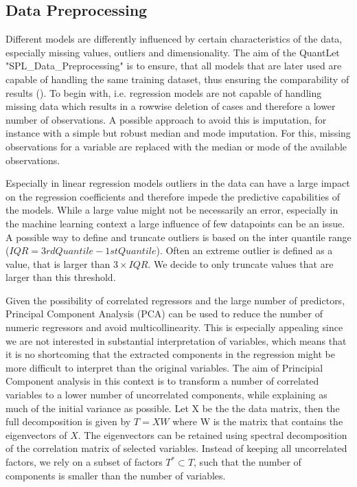 \subsection{Data Preprocessing}\label{sec:data_theory}

Different models are differently influenced by certain characteristics of the data, especially missing values, outliers and dimensionality.  The aim of the QuantLet "SPL\_Data\_Preprocessing" is to ensure, that all models that are later used are capable of handling the same training dataset, thus ensuring the comparability of results (\cite{friedman_elements_2001}). 
To begin with, i.e. regression models are not capable of handling missing data which results in a rowwise deletion of cases and therefore a lower number of observations. A possible approach to avoid this is  imputation, for instance with a simple but robust median and mode imputation. For this, missing observations for a variable are replaced with the median or mode of the available observations.

Especially in linear regression models outliers in the data can have a large impact on the regression coefficients and therefore impede the predictive  capabilities of the  models. While a large value might not be necessarily an error, especially in the machine learning context a large influence of few datapoints can be an issue. A possible way to define and truncate outliers is based on the inter quantile range ($IQR = 3rd Quantile -1st Quantile$).
Often an extreme outlier is defined as a value, that is larger than $3 \times IQR$. We decide to only truncate values that are larger than this threshold. 

Given the possibility of correlated regressors and the large number of predictors, Principal Component Analysis (PCA) can be used to reduce the number of numeric regressors and avoid multicollinearity. This is especially appealing since we are not interested in substantial interpretation of variables, which means that it is no shortcoming that the extracted components in the regression might be more difficult to interpret than the original variables. 
The aim of Principial Component analysis in this context is to transform a number of correlated variables to a lower number of uncorrelated components, while explaining as much of the initial variance as possible. 
Let X be the the data matrix, then the full decomposition is given by   $  T = XW $
where W is the matrix that contains the eigenvectors of $X$.  
The eigenvectors can be retained using spectral decomposition of the correlation matrix of selected variables.
Instead of keeping all uncorrelated factors, we rely on a subset of factors $T^* \subset T$, such that the number of components is smaller than the number of variables.
 
